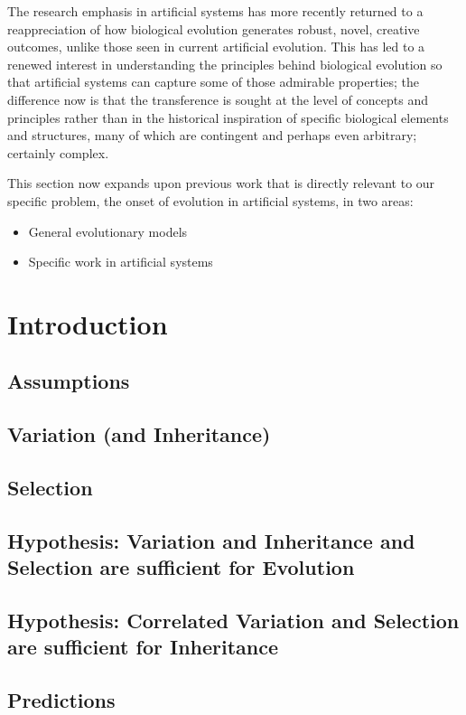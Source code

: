 \documentclass[]{report}
\begin{document}
The research emphasis in artificial systems has more recently returned to a reappreciation of how biological evolution generates robust, novel, creative outcomes, unlike those seen in current artificial evolution. This has led to a renewed interest in understanding the principles behind biological evolution so that artificial systems can capture some of those admirable properties; the difference now is that the transference is sought at the level of concepts and principles rather than in the historical inspiration of specific biological elements and structures, many of which are contingent and perhaps even arbitrary; certainly complex.

This section now expands upon previous work that is directly relevant to our specific problem, the onset of evolution in artificial systems, in two areas:

\begin{itemize}
	\item General evolutionary models
	\item Specific work in artificial systems
\end{itemize}

\chapter{Introduction}
\section{Assumptions}
\section{Variation (and Inheritance)}
\section{Selection}
\section{Hypothesis: Variation and Inheritance and Selection are sufficient for Evolution}
\section{Hypothesis: Correlated Variation and Selection are sufficient for Inheritance}
\section{Predictions}
\end{document}
